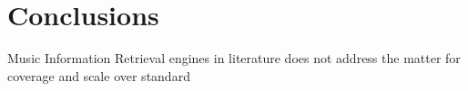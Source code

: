 \chapter{Conclusions}

\noindent Music Information Retrieval engines in literature does not address the matter for coverage and scale over standard 